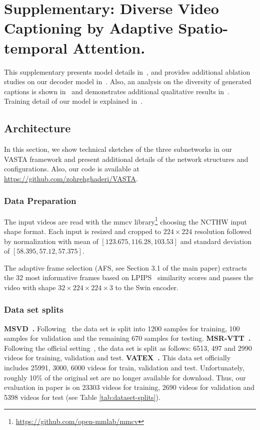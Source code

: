 \documentclass[runningheads,table]{llncs}
\newcommand{\modelName}{VASTA\xspace}
\begin{document}
\newpage
\section{Supplementary: Diverse Video Captioning by Adaptive Spatio-temporal Attention.}






This supplementary presents model details in~, and provides additional ablation studies on our decoder model in~. 
Also, an analysis on the diversity of generated captions is shown in~ and demonstrates additional qualitative results in~.
Training detail of our model is explained in~. 


\subsection{Architecture}\label{sec:architecture}
\label{sec:architecture}
In this section, we show technical sketches of the three subnetworks in our \modelName{} framework and present additional details of the network structures and configurations.  Also, our code is available at \url{https://github.com/zohrehghaderi/VASTA}.
\subsubsection{Data Preparation}
The input videos are read with the mmcv library\footnote{\url{https://github.com/open-mmlab/mmcv}} choosing the NCTHW input shape format. Each input is resized and cropped to $224\times224$ resolution followed by normalization with 
mean of $[123.675,116.28,103.53]$ and standard deviation of $[58.395, 57.12,57.375]$. 

The adaptive frame selection (AFS, see Section 3.1 of the main paper) extracts the 32 most informative frames based on LPIPS~\cite{zhang2018perceptual}  similarity scores and passes the video with shape $32\times 224\times 224\times 3$ to the Swin encoder. 


\subsubsection{Data set splits}

\textbf{MSVD~\cite{chen2011collecting}.} Following~\cite{chen2011collecting,yao2015describing} the data set is split into 1200 samples for training, 100 samples for validation and the remaining 670 samples for testing.
\textbf{{MSR-VTT}~\cite{xu2016msr}.}
Following the official setting~\cite{xu2016msr}, the data set is split as follows: 6513, 497 and 2990 videos for training, validation and test.
\textbf{VATEX~\cite{wang2019vatex}.}
This data set officially includes 25991, 3000, 6000 videos for train, validation and test.
Unfortunately, roughly 10\% of the original set are no longer available for download. 
Thus, our evaluation in paper is on 23303 videos for training, 2690 videos for validation and 5398 videos for test (see Table \cref{tab:dataset-splits}).
\end{document}
